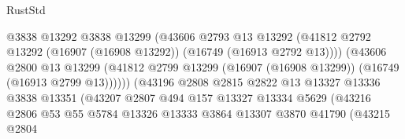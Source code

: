 \begin{lexlean}{RustStd}
\begin{coremodule}
                                          @3838
                                          @13292
                                          @3838
                                          @13299
                                          (@43606
                                            @2793
                                            @13
                                            @13292
                                            (@41812
                                              @2792
                                              @13292
                                              (@16907 (@16908 @13292))
                                              (@16749 (@16913 @2792 @13))))
                                          (@43606
                                            @2800
                                            @13
                                            @13299
                                            (@41812
                                              @2799
                                              @13299
                                              (@16907 (@16908 @13299))
                                              (@16749 (@16913 @2799 @13))))))
                                      (@43196
                                        @2808
                                        @2815
                                        @2822
                                        @13
                                        @13327
                                        @13336
                                        @3838
                                        @13351
                                        (@43207
                                          @2807
                                          @494
                                          @157
                                          @13327
                                          @13334
                                          @5629
                                          (@43216
                                            @2806
                                            @53
                                            @55
                                            @5784
                                            @13326
                                            @13333
                                            @3864
                                            @13307
                                            @3870
                                            @41790
                                            (@43215
                                              @2804

\end{coremodule}
\end{lexlean}
